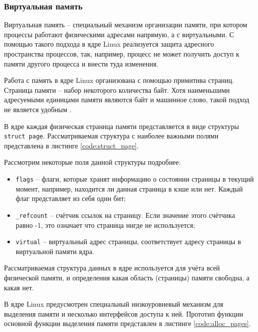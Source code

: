 \subsubsection{Виртуальная память}

Виртуальная память -- специальный механизм организации памяти, при котором процессы работают физическими адресами напрямую, а с виртуальными. С помощью такого подхода в ядре Linux реализуется защита адресного пространства процессов, так, например, процесс не может получить доступ к памяти другого процесса и внести туда изменения.

Работа с память в ядре Linux организована с помощью примитива страниц. Страница памяти -- набор некоторого количества байт. Хотя наименьшими адресуемыми единицами памяти являются байт и машинное слово, такой подход не является удобным \cite{kernel-development}. 

В ядре каждая физическая страница памяти представляется в виде структуры \texttt{struct page}. Рассматриваемая структура с наиболее важными полями представлена в листинге \ref{code:struct_page}.


Рассмотрим некоторые поля данной структуры подробнее:

\begin{itemize}
	\item \texttt{flags} -- флаги, которые хранят информацию о состоянии страницы в текущий момент, например, находится ли данная страница в кэше или нет. Каждый флаг представляет из себя один бит;
	\item \texttt{\_refcount} -- счётчик ссылок на страницу. Если значение этого счётчика равно -1, это означает что страница нигде не используется;
	\item \texttt{virtual} -- виртуальный адрес страницы, соответствует адресу страницы в виртуальной памяти ядра.
\end{itemize}

Рассматриваемая структура данных в ядре используется для учёта всей физической памяти, и определения какая область (страницы) памяти свободна, а какая нет. 

В ядре Linux предусмотрен специальный низкоуровневый механизм для выделения памяти и несколько интерфейсов доступа к ней. Прототип функции основной функции выделения памяти представлен в листинге \ref{code:alloc_pages}.


